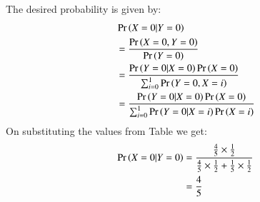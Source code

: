 The desired probability is given by:
	\begin{align}
		&\Pr\left(X = 0|Y = 0\right) \\ 
		&= \frac{\Pr\left(X = 0,Y = 0\right)}{\Pr\left(Y = 0\right)} \\
		&= \frac{\Pr\left(Y = 0|X = 0\right)\Pr\left(X = 0\right)}{\sum_{i=0}^1 \Pr\left(Y = 0,X = i\right)} \\
		&= \frac{\Pr\left(Y = 0|X = 0\right)\Pr\left(X = 0\right)}{\sum_{i=0}^1 \Pr\left(Y = 0|X = i\right)\Pr\left(X = i\right)}
	\end{align}
On substituting the values from Table  we get:
	\begin{align}
		\Pr\left(X = 0|Y = 0\right) &= \frac{\frac45 \times \frac12}{\frac45 \times \frac12 +\frac15 \times \frac12} \\
		&= \frac{4}{5} 
	\end{align}
